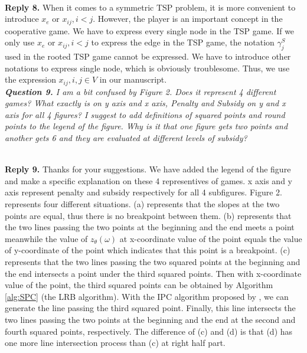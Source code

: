 \documentclass[11pt]{article}
\begin{document}
\\[2mm]
\noindent \textbf{Reply 8.}
When it comes to a symmetric TSP problem, it is more convenient to introduce $x_e$ or $x_{ij}, i<j$.
However, the player is an important concept in the cooperative game.
We have to express every single node in the TSP game.
If we only use $x_e$ or $x_{ij}, i<j$ to express the edge in the TSP game, the notation $\gamma^{S}_j$ used in the rooted TSP game cannot be expressed. We have to introduce other notations to express single node, which is obviously troublesome.
Thus, we use the expression $x_{ij}, i,j \in V$ in our manuscript.
\\[4mm]


\noindent \textit{\textbf{Question 9.}
I am a bit confused by Figure 2. Does it represent 4 different games? What exactly is on y axis and x axis, Penalty and Subsidy on y and x axis for all 4 figures? I suggest to add definitions of squared points and round points to the legend of the figure. Why is it that one figure gets two points and another gets 6 and they are evaluated at different levels of subsidy?}

\\[2mm]
\noindent \textbf{Reply 9.}
Thanks for your suggestions.
We have added the legend of the figure and make a specific explanation on these 4 representives of games.
x axis and y axis represent penalty and subsidy respectively for all 4 subfigures.
Figure 2. represents four different situations. (a) represents that the slopes at the two points are equal, thus there is no breakpoint between them. (b) represents that the two lines passing the two points at the beginning and the end meets a point meanwhile the value of $z_\theta(\omega)$ at x-coordinate value of the point equals the value of y-coordinate of the point which indicates that this point is a breakpoint. (c) represents that the two lines passing the two squared points at the beginning and the end intersects a point under the third squared points. Then with x-coordinate value of the point, the third squared points can be obtained by Algorithm \ref{alg:SPC} (the LRB algorithm). With the IPC algorithm proposed by \cite{leastcore2018}, we can generate the line passing the third squared point. Finally, this line
intersects the two lines passing the two points at the beginning and the end at the second and fourth squared points, respectively.
The difference of (c) and (d) is that (d) has one more line intersection process than (c) at right half part.
\end{document}
